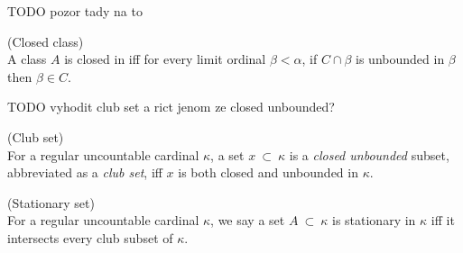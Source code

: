 TODO pozor tady na to

\begin{definition}{(Closed class)}\\
A class $A$ is closed in iff for every limit ordinal $\beta < \alpha$, if $C \cap \beta$ is unbounded in $\beta$ then $\beta \in C$.
\end{definition}

TODO vyhodit club set a rict jenom ze closed unbounded? 
\begin{definition}{(Club set)}\\
For a regular uncountable cardinal $\kappa$, a set $x\ \subset\ \kappa$ is a \emph{closed unbounded} subset, abbreviated as a \emph{club set}, iff $x$ is both closed and unbounded in $\kappa$.
\end{definition}

\begin{definition}{(Stationary set)}\\
For a regular uncountable cardinal $\kappa$, we say a set $A\ \subset\ \kappa$ is stationary in $\kappa$ iff it intersects every club subset of $\kappa$.
\end{definition}

\



